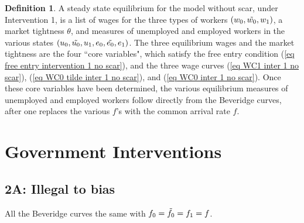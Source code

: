 \documentclass[12pt]{article} %
\theoremstyle{definition}
\newtheorem{definition}{Definition}%
\begin{document}
\begin{definition}\label{definition equil inter 1 no scar}
    A steady state equilibrium for the model without scar, under Intervention 1, is a list of wages for the three types of workers $(w_0, \Tilde{w_0}, w_1)$, a market tightness $\theta$, and measures of unemployed and employed workers in the various states $(u_0, \Tilde{u_0}, u_1, e_0, \Tilde{e_0}, e_1)$. The three equilibrium wages and the market tightness are the four ``core variables", which satisfy the free entry condition (\ref{eq free entry intervention 1 no scar}), and the three wage curves (\ref{eq WC1 inter 1 no scar}), (\ref{eq WC0 tilde inter 1 no scar}), and (\ref{eq WC0 inter 1 no scar}). Once these core variables have been determined, the various equilibrium measures of unemployed and employed workers follow directly from the Beveridge curves, after one replaces the various $f$'s with the common arrival rate $f$.
\end{definition} 

\section{Government Interventions}
\subsection{2A: Illegal to bias}
All the Beveridge curves the same with $f_0=\Tilde{f_0}=f_1=f$.
\end{document}
